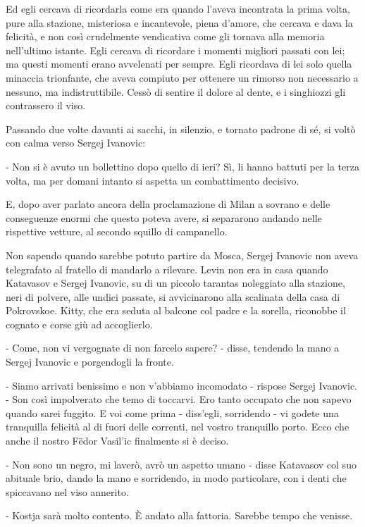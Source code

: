 Ed egli cercava di ricordarla come era quando l'aveva incontrata la prima volta, pure alla stazione, misteriosa e incantevole, piena d'amore, che cercava e dava la felicità, e non così crudelmente vendicativa come gli tornava alla memoria nell'ultimo istante. Egli cercava di ricordare i momenti migliori passati con lei; ma questi momenti erano avvelenati per sempre. Egli ricordava di lei solo quella minaccia trionfante, che aveva compiuto per ottenere un rimorso non necessario a nessuno, ma indistruttibile. Cessò di sentire il dolore al dente, e i singhiozzi gli contrassero il viso. 

Passando due volte davanti ai sacchi, in silenzio, e tornato padrone di sé, si voltò con calma verso Sergej Ivanovic: 

- Non si è avuto un bollettino dopo quello di ieri? Sì, li hanno battuti per la terza volta, ma per domani intanto si aspetta un combattimento decisivo. 

E, dopo aver parlato ancora della proclamazione di Milan a sovrano e delle conseguenze enormi che questo poteva avere, si separarono andando nelle rispettive vetture, al secondo squillo di campanello. 

Non sapendo quando sarebbe potuto partire da Mosca, Sergej Ivanovic non aveva telegrafato al fratello di mandarlo a rilevare. Levin non era in casa quando Katavasov e Sergej Ivanovic, su di un piccolo tarantas noleggiato alla stazione, neri di polvere, alle undici passate, si avvicinarono alla scalinata della casa di Pokrovskoe. Kitty, che era seduta al balcone col padre e la sorella, riconobbe il cognato e corse giù ad accoglierlo. 

- Come, non vi vergognate di non farcelo sapere? - disse, tendendo la mano a Sergej Ivanovic e porgendogli la fronte. 

- Siamo arrivati benissimo e non v'abbiamo incomodato - rispose Sergej Ivanovic. - Son così impolverato che temo di toccarvi. Ero tanto occupato che non sapevo quando sarei fuggito. E voi come prima - diss'egli, sorridendo - vi godete una tranquilla felicità al di fuori delle correnti, nel vostro tranquillo porto. Ecco che anche il nostro Fëdor Vasil'ic finalmente si è deciso. 

- Non sono un negro, mi laverò, avrò un aspetto umano - disse Katavasov col suo abituale brio, dando la mano e sorridendo, in modo particolare, con i denti che spiccavano nel viso annerito. 

- Kostja sarà molto contento. È andato alla fattoria. Sarebbe tempo che venisse. 


